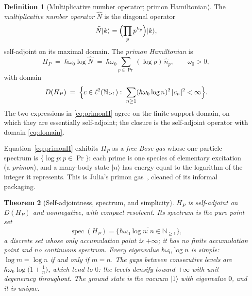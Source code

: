 \documentclass[11pt,a4paper]{article}
\theoremstyle{plain}
\newtheorem{theorem}{Theorem}[section]
\theoremstyle{definition}
\newtheorem{definition}[theorem]{Definition}
\theoremstyle{remark}
\newcommand{\ket}[1]{\lvert #1\rangle}
\newcommand{\Nn}{\mathbb{N}}
\newcommand{\Nhat}{\widehat{N}}
\DeclareMathOperator{\spec}{spec}
\begin{document}
\begin{definition}[Multiplicative number operator; primon Hamiltonian]\label{def:hamiltonian}
The \emph{multiplicative number operator} $\Nhat$ is the diagonal operator
\begin{equation}
\Nhat\ket{k}=\Bigl(\prod_{p}p^{k_{p}}\Bigr)\ket{k},
\end{equation}
self-adjoint on its maximal domain. The \emph{primon Hamiltonian} is
\begin{equation}\label{eq:primonH}
H_{P}\;=\;\hbar\omega_{0}\log\Nhat
\;=\;\hbar\omega_{0}\sum_{p\in\Pr}(\log p)\,\hat n_{p},
\qquad \omega_{0}>0,
\end{equation}
with domain
\begin{equation}\label{eq:domain}
D(H_{P})\;=\;\Bigl\{c\in\ell^{2}(\Nn_{\geq1}):\ \sum_{n\geq1}(\hbar\omega_{0}\log n)^{2}\,|c_{n}|^{2}<\infty\Bigr\}.
\end{equation}
The two expressions in \eqref{eq:primonH} agree on the finite-support domain, on which they
are essentially self-adjoint; the closure is the self-adjoint operator with domain
\eqref{eq:domain}.
\end{definition}

Equation~\eqref{eq:primonH} exhibits $H_{P}$ as a \emph{free Bose gas} whose one-particle
spectrum is $\{\log p:p\in\Pr\}$: each prime is one species of elementary excitation (a
\emph{primon}), and a many-body state $\ket{n}$ has energy equal to the logarithm of the
integer it represents. This is Julia's primon gas~\cite{julia1990}, cleaned of its informal
packaging.

\begin{theorem}[Self-adjointness, spectrum, and simplicity]\label{thm:spectrum}
$H_{P}$ is self-adjoint on $D(H_{P})$ and nonnegative, with compact resolvent. Its spectrum
is the pure point set
\begin{equation}
\spec(H_{P})=\overline{\{\hbar\omega_{0}\log n:n\in\Nn_{\geq 1}\}},
\end{equation}
a discrete set whose only accumulation point is $+\infty$; it has no finite accumulation
point and no continuous spectrum. Every eigenvalue $\hbar\omega_{0}\log n$ is
\emph{simple}: $\log m=\log n$ if and only if $m=n$. The gaps between consecutive levels are
$\hbar\omega_{0}\log\bigl(1+\tfrac1n\bigr)$, which tend to $0$: the levels \emph{densify}
toward $+\infty$ with unit degeneracy throughout. The ground state is the vacuum
$\ket{1}$ with eigenvalue $0$, and it is unique.
\end{theorem}
\end{document}
